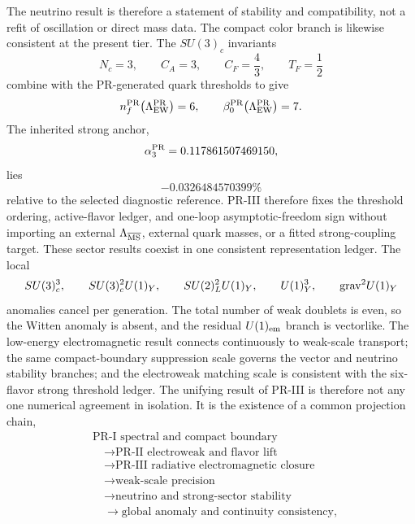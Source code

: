 \documentclass[11pt]{article}
\begin{document}
The neutrino result is therefore a statement of stability and compatibility, not a refit of oscillation or direct mass data. The compact color branch is likewise consistent at the present tier.  The \(SU(3)_c\) invariants
\begin{equation}
N_c=3,
\qquad
C_A=3,
\qquad
C_F=\frac43,
\qquad
T_F=\frac12
\end{equation}
combine with the PR-generated quark thresholds to give
\begin{equation}
n_f^{\rm PR}\!\left(\Lambda_{\rm EW}^{\rm PR}\right)=6,
\qquad
\beta_0^{\rm PR}\!\left(\Lambda_{\rm EW}^{\rm PR}\right)=7.
\end{equation}
The inherited strong anchor,
\begin{equation}
\alpha_3^{\rm PR}
=
0.117861507469150,
\end{equation}
lies
\begin{equation}
-0.0326484570399\%
\end{equation}
relative to the selected diagnostic reference.  PR-III therefore fixes the threshold ordering, active-flavor ledger, and one-loop asymptotic-freedom sign without importing an external \(\Lambda_{\overline{\rm MS}}\), external quark masses, or a fitted strong-coupling target. These sector results coexist in one consistent representation ledger. The local
\begin{equation}
SU(3)_c^3,\qquad
SU(3)_c^2U(1)_Y,\qquad
SU(2)_L^2U(1)_Y,\qquad
U(1)_Y^3,
\qquad
{\rm grav}^2U(1)_Y
\end{equation}
anomalies cancel per generation.  The total number of weak doublets is even, so the Witten anomaly is absent, and the residual \(U(1)_{\rm em}\) branch is vectorlike.  The low-energy electromagnetic result connects continuously to weak-scale transport; the same compact-boundary suppression scale governs the vector and neutrino stability branches; and the electroweak matching scale is consistent with the six-flavor strong threshold ledger. The unifying result of PR-III is therefore not any one numerical agreement in isolation.  It is the existence of a common projection chain,
\begin{equation}
\boxed{
\begin{aligned}
&\text{PR-I spectral and compact boundary}
\\
&\quad\longrightarrow
\text{PR-II electroweak and flavor lift}
\\
&\quad\longrightarrow
\text{PR-III radiative electromagnetic closure}
\\
&\quad\longrightarrow
\text{weak-scale precision}
\\
&\quad\longrightarrow
\text{neutrino and strong-sector stability}
\\
&\quad\longrightarrow
\text{global anomaly and continuity consistency},
\end{aligned}
}
\end{equation}
\end{document}
